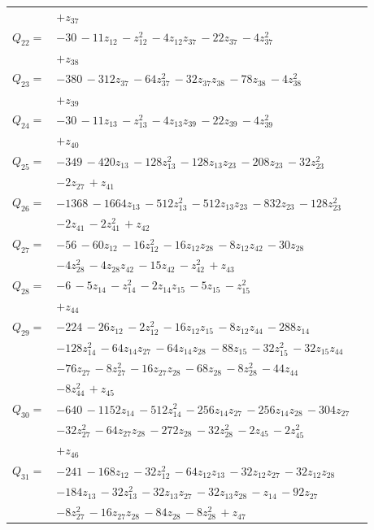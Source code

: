 \begin{longtable}{@{}r p{0.88\linewidth}@{}}
 & $+z_{37}$\\[5pt]
$Q_{22}=$ & $-30\,-11z_{12}\,-z_{12}^{2}\,-4z_{12}z_{37}\,-22z_{37}\,-4z_{37}^{2}$\\
 & $+z_{38}$\\[5pt]
$Q_{23}=$ & $-380\,-312z_{37}\,-64z_{37}^{2}\,-32z_{37}z_{38}\,-78z_{38}\,-4z_{38}^{2}$\\
 & $+z_{39}$\\[5pt]
$Q_{24}=$ & $-30\,-11z_{13}\,-z_{13}^{2}\,-4z_{13}z_{39}\,-22z_{39}\,-4z_{39}^{2}$\\
 & $+z_{40}$\\[5pt]
$Q_{25}=$ & $-349\,-420z_{13}\,-128z_{13}^{2}\,-128z_{13}z_{23}\,-208z_{23}\,-32z_{23}^{2}$\\
 & $-2z_{27}\,+z_{41}$\\[5pt]
$Q_{26}=$ & $-1368\,-1664z_{13}\,-512z_{13}^{2}\,-512z_{13}z_{23}\,-832z_{23}\,-128z_{23}^{2}$\\
 & $-2z_{41}\,-2z_{41}^{2}\,+z_{42}$\\[5pt]
$Q_{27}=$ & $-56\,-60z_{12}\,-16z_{12}^{2}\,-16z_{12}z_{28}\,-8z_{12}z_{42}\,-30z_{28}$\\
 & $-4z_{28}^{2}\,-4z_{28}z_{42}\,-15z_{42}\,-z_{42}^{2}\,+z_{43}$\\[5pt]
$Q_{28}=$ & $-6\,-5z_{14}\,-z_{14}^{2}\,-2z_{14}z_{15}\,-5z_{15}\,-z_{15}^{2}$\\
 & $+z_{44}$\\[5pt]
$Q_{29}=$ & $-224\,-26z_{12}\,-2z_{12}^{2}\,-16z_{12}z_{15}\,-8z_{12}z_{44}\,-288z_{14}$\\
 & $-128z_{14}^{2}\,-64z_{14}z_{27}\,-64z_{14}z_{28}\,-88z_{15}\,-32z_{15}^{2}\,-32z_{15}z_{44}$\\
 & $-76z_{27}\,-8z_{27}^{2}\,-16z_{27}z_{28}\,-68z_{28}\,-8z_{28}^{2}\,-44z_{44}$\\
 & $-8z_{44}^{2}\,+z_{45}$\\[5pt]
$Q_{30}=$ & $-640\,-1152z_{14}\,-512z_{14}^{2}\,-256z_{14}z_{27}\,-256z_{14}z_{28}\,-304z_{27}$\\
 & $-32z_{27}^{2}\,-64z_{27}z_{28}\,-272z_{28}\,-32z_{28}^{2}\,-2z_{45}\,-2z_{45}^{2}$\\
 & $+z_{46}$\\[5pt]
$Q_{31}=$ & $-241\,-168z_{12}\,-32z_{12}^{2}\,-64z_{12}z_{13}\,-32z_{12}z_{27}\,-32z_{12}z_{28}$\\
 & $-184z_{13}\,-32z_{13}^{2}\,-32z_{13}z_{27}\,-32z_{13}z_{28}\,-z_{14}\,-92z_{27}$\\
 & $-8z_{27}^{2}\,-16z_{27}z_{28}\,-84z_{28}\,-8z_{28}^{2}\,+z_{47}$\\[5pt]

\end{longtable}

